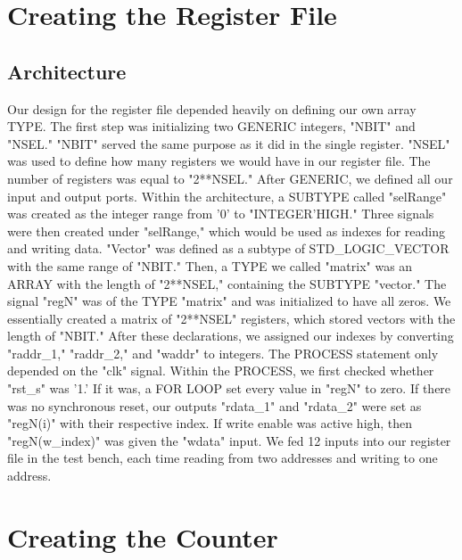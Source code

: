 \documentclass[paper=letter, fontsize=11pt]{scrartcl}
\numberwithin{equation}{section} %
\numberwithin{figure}{section} %
\numberwithin{table}{section} %
\begin{document}
\section{Creating the Register File}

\subsection{Architecture}
\begin{flushleft}
	Our design for the register file depended heavily on defining our own array TYPE. The first step was initializing two GENERIC integers, "NBIT" and "NSEL." "NBIT" served the same purpose as it did in the single register. "NSEL" was used to define how many registers we would have in our register file. The number of registers was equal to "2**NSEL." After GENERIC, we defined all our input and output ports. Within the architecture, a SUBTYPE called "selRange" was created as the integer range from '0' to "INTEGER'HIGH." Three signals were then created under "selRange," which would be used as indexes for reading and writing data. "Vector" was defined as a subtype of STD\_LOGIC\_VECTOR with the same range of "NBIT." Then, a TYPE we called "matrix" was an ARRAY with the length of "2**NSEL," containing the SUBTYPE "vector." The signal "regN" was of the TYPE "matrix" and was initialized to have all zeros. We essentially created a matrix of "2**NSEL" registers, which stored vectors with the length of "NBIT." After these declarations, we assigned our indexes by converting "raddr\_1," "raddr\_2," and "waddr" to integers. The PROCESS statement only depended on the "clk" signal. Within the PROCESS, we first checked whether "rst\_s" was '1.' If it was, a FOR LOOP set every value in "regN" to zero. If there was no synchronous reset, our outputs "rdata\_1" and "rdata\_2" were set as "regN(i)" with their respective index. If write enable was active high, then "regN(w\_index)" was given the "wdata" input. We fed 12 inputs into our register file in the test bench, each time reading from two addresses and writing to one address. \\[20pt]      
\end{flushleft}


\section{Creating the Counter}
\end{document}
